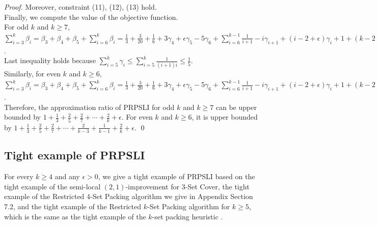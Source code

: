 \documentclass[runningheads,a4paper]{llncs}
\numberwithin{equation}{section}
\begin{document}
\begin{proof}
Moreover, constraint (11), (12), (13) hold. \\

Finally, we compute the value of the objective function. \\

For odd $k$ and $k\geq 7$,
$\sum_{i=3}^k\beta_i=\beta_3+\beta_4+\beta_5+\sum_{i=6}^k\beta_i=\frac{1}{3}+\frac{3}{20}+\frac{1}{6}+3\gamma_4+\epsilon\gamma_5-5\gamma_6
+\sum_{i=6}^{k-1}\frac{1}{i+1}-i\gamma_{i+1}+(i-2+\epsilon)\gamma_i+1+(k-2+\epsilon)\gamma_k
=\frac{1}{3}+\frac{3}{20}+\frac{1}{6}+3\gamma_4-5\gamma_6+1+\frac{1}{7}-\gamma_7+4\gamma_6+\sum_{i=8}^k \frac{1}{i}-(\frac{1}{8\cdot 9}+\frac{1}{10\cdot 11}+\cdots+\frac{1}{(k-1)k})+\epsilon\sum_{i=5}^k \gamma_i=1+\frac{1}{3}+\frac{2}{5}+\frac{1}{6}+\frac{1}{7}-5\gamma_6-(\frac{1}{42}-\gamma_6)+4\gamma_6+2(\frac{1}{9}+\cdots\frac{1}{k})+\epsilon\sum_{i=5}^k\gamma_i
\leq 1+\frac{1}{3}+\frac{2}{5}+\frac{2}{7}+\cdots+\frac{2}{k}+\epsilon$. \\

Last inequality holds because $\sum_{i=5}^k\gamma_i\leq\sum_{i=5}^k\frac{1}{(i+1)i}\leq\frac{1}{5}$. \\

Similarly, for even $k$ and $k\geq 6$, $\sum_{i=3}^k\beta_i=\beta_3+\beta_4+\beta_5+\sum_{i=6}^k\beta_i=\frac{1}{3}+\frac{3}{20}+\frac{1}{6}+3\gamma_4+\epsilon\gamma_5-5\gamma_6
+\sum_{i=6}^{k-1}\frac{1}{i+1}-i\gamma_{i+1}+(i-2+\epsilon)\gamma_i+1+(k-2+\epsilon)\gamma_k
=\frac{1}{3}+\frac{3}{20}+\frac{1}{6}+3\gamma_4-5\gamma_6+1+\frac{1}{7}-\gamma_7+4\gamma_6+\sum_{i=8}^k \frac{1}{i}-(\frac{1}{8\cdot 9}+\frac{1}{10\cdot 11}+\cdots+\frac{1}{(k-2)(k-1)}+\frac{1}{(k-1)k})+\epsilon\sum_{i=5}^k \gamma_i=1+\frac{1}{3}+\frac{2}{5}+\frac{1}{6}+\frac{1}{7}-5\gamma_6-(\frac{1}{42}-\gamma_6)+4\gamma_6+2(\frac{1}{9}+\cdots\frac{1}{k-3})+\frac{1}{k-1}+\frac{2}{k}+\epsilon\sum_{i=5}^k\gamma_i
\leq 1+\frac{1}{3}+\frac{2}{5}+\frac{2}{7}+\cdots+\frac{2}{k-3}+\frac{1}{k-1}+\frac{2}{k}+\epsilon$. \\


Therefore, the approximation ratio of PRPSLI for odd $k$ and $k\geq 7$ can be upper bounded by $1+\frac{1}{3}+\frac{2}{5}+\frac{2}{7}+\cdots+\frac{2}{k}+\epsilon$. For even $k$ and $k\geq 6$, it is upper bounded by $1+\frac{1}{3}+\frac{2}{5}+\frac{2}{7}+\cdots+\frac{2}{k-3}+\frac{1}{k-1}+\frac{2}{k}+\epsilon$. \qed
\end{proof}


\subsection{Tight example of PRPSLI}
For every $k\geq 4$ and any $\epsilon>0$, we give a tight example of PRPSLI based on the tight example of the semi-local $(2,1)$-improvement \cite{furer} for 3-Set Cover, the tight example of the Restricted 4-Set Packing algorithm we give in Appendix Section 7.2, and the tight example of the Restricted $k$-Set Packing algorithm for $k\geq 5$, which is the same as the tight example of the $k$-set packing heuristic \cite{schrijver}. \\
\end{document}
